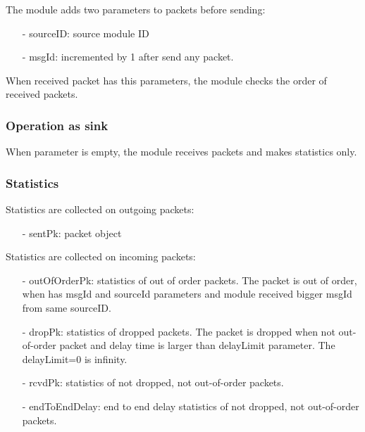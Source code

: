 The module adds two parameters to packets before sending:
\begin{itemize}
\item[-] sourceID: source module ID
\item[-] msgId: incremented by 1 after send any packet.
\end{itemize}
When received packet has this parameters, the module checks the order of received packets.

\subsubsection*{Operation as sink}

When  parameter is empty, the module receives packets and makes statistics only.

\subsubsection*{Statistics}

Statistics are collected on outgoing packets:
\begin{itemize}
\item[-] sentPk: packet object
\end{itemize}

Statistics are collected on incoming packets:
\begin{itemize}
\item[-] outOfOrderPk: statistics of out of order packets.
       The packet is out of order, when has msgId and sourceId parameters and module
       received bigger msgId from same sourceID.
\item[-] dropPk: statistics of dropped packets. 
       The packet is dropped when not out-of-order packet and delay time is larger than
       delayLimit parameter. The delayLimit=0 is infinity.
\item[-] rcvdPk: statistics of not dropped, not out-of-order packets.
\item[-] endToEndDelay: end to end delay statistics of not dropped, not out-of-order packets.
\end{itemize}



